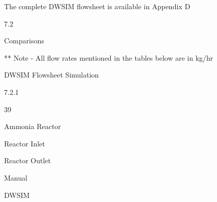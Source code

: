 \documentclass[a4paper,portrait,12pt]{article}
\begin{document}
\begin{flushleft}
The complete DWSIM flowsheet is available in Appendix D
\end{flushleft}





7.2





\begin{flushleft}
Comparisons
\end{flushleft}





\begin{flushleft}
** Note - All flow rates mentioned in the tables below are in kg/hr
\end{flushleft}





\begin{flushleft}
\newpage
DWSIM Flowsheet Simulation
\end{flushleft}





7.2.1





39





\begin{flushleft}
Ammonia Reactor
\end{flushleft}


\begin{flushleft}
Reactor Inlet
\end{flushleft}





\begin{flushleft}
Reactor Outlet
\end{flushleft}





\begin{flushleft}
Manual
\end{flushleft}





\begin{flushleft}
DWSIM
\end{flushleft}
\end{document}
